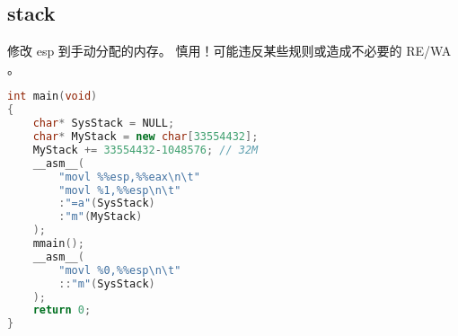 \subsection{stack}
修改 esp 到手动分配的内存。
慎用！可能违反某些规则或造成不必要的 RE/WA 。
\begin{lstlisting}[language=C++]
int main(void)
{
	char* SysStack = NULL;
	char* MyStack = new char[33554432];
	MyStack += 33554432-1048576; // 32M
	__asm__(
		"movl %%esp,%%eax\n\t"
		"movl %1,%%esp\n\t"
		:"=a"(SysStack)
		:"m"(MyStack)
	);
	mmain();
	__asm__(
		"movl %0,%%esp\n\t"
		::"m"(SysStack)
	);
	return 0;
}
\end{lstlisting}
